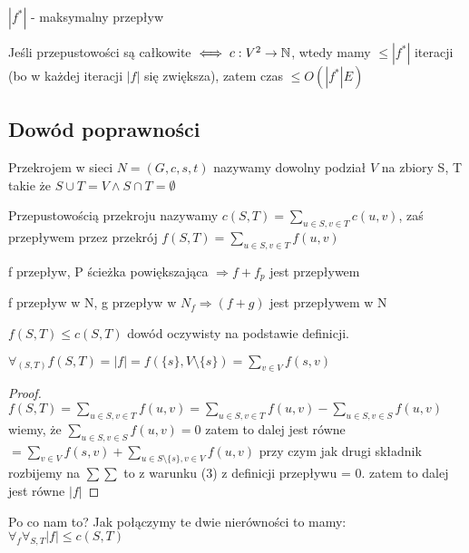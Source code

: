 $|f^*|$ - maksymalny przepływ

Jeśli przepustowości są całkowite $ \iff c: V^2 \rightarrow \mathbb{N}$, wtedy mamy $\le |f^*|$ iteracji (bo w każdej iteracji $|f|$ się zwiększa), zatem czas $ \le O(|f^*|E)$  

\subsection{Dowód poprawności}

\begin{defi}[Przekrój]
    Przekrojem w sieci $N = (G,c,s,t)$ nazywamy dowolny podział $V$ na zbiory S, T takie że $S \cup T = V \land S \cap T = \emptyset$
\end{defi}

\begin{defi}
    Przepustowością przekroju nazywamy $c(S,T) = \sum_{u \in S, v \in T} c(u,v)$, zaś przepływem przez przekrój $f(S,T) = \sum_{u \in S, v \in T} f(u,v)$
\end{defi}

\begin{lemat}
    f przepływ, P ścieżka powiększająca $\Rightarrow f + f_p$ jest przepływem
\end{lemat}

\begin{lemat}
    f przepływ w N, g przepływ w $N_f \Rightarrow (f + g)$ jest przepływem w N
\end{lemat}

\begin{lemat}
    $f(S,T) \le c(S,T)$ dowód oczywisty na podstawie definicji.
\end{lemat}

\begin{lemat}
    $\forall_{(S,T)} f(S,T) = |f| = f(\{ s \}, V \setminus \{ s \} ) = \sum_{v \in V} f(s,v)$
\end{lemat}
\begin{proof}
     $f(S,T) = \sum_{u \in S, v \in T} f(u,v) = \sum_{u \in S, v \in T} f(u,v) - \sum_{u \in S, v \in S} f(u,v) $ wiemy, że $\sum_{u \in S, v \in S} f(u,v) = 0$ zatem to dalej jest równe $ = \sum_{v \in V} f(s,v) + \sum_{u \in S \setminus \{ s \}, v \in V } f(u,v)$ przy czym jak drugi składnik rozbijemy na $\sum \sum$ to z warunku (3) z definicji przepływu = 0. zatem to dalej jest równe $ |f| $
\end{proof}


Po co nam to?
Jak połączymy te dwie nierówności to mamy:
$\forall_f \forall_{S, T} |f| \le c(S,T)$

